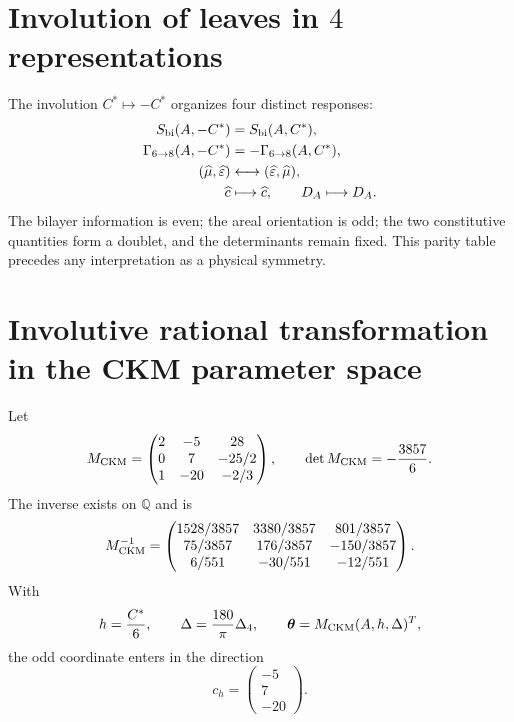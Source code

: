 \section{Involution of leaves in \(4\) representations}

The involution \(C^*\mapsto-C^*\) organizes four distinct responses:
\begin{equation}
\label{rm:eq:modular-sheet-parities}
\begin{aligned}
S_{\rm bi}(A,-C^*)&=S_{\rm bi}(A,C^*),\\
\Gamma_{6\to8}(A,-C^*)&=-\Gamma_{6\to8}(A,C^*),\\
(\widehat\mu,\widehat\varepsilon)&\longleftrightarrow
(\widehat\varepsilon,\widehat\mu),\\
\widehat c&\longmapsto\widehat c,
\qquad D_A\longmapsto D_A.
\end{aligned}
\end{equation}
The bilayer information is even; the areal orientation is odd; the two
constitutive quantities form a doublet, and the determinants remain fixed. This parity
table precedes any interpretation as a physical symmetry.

\section{Involutive rational transformation in the CKM parameter space}

Let
\begin{equation}
\label{rm:eq:modular-Mckm}
M_{\rm CKM}=
\begin{pmatrix}
2&-5&28\\
0&7&-25/2\\
1&-20&-2/3
\end{pmatrix},
\qquad
\det M_{\rm CKM}=-\frac{3857}{6}.
\end{equation}
The inverse exists on \(\mathbb Q\) and is
\begin{equation}
\label{rm:eq:modular-Mckm-inverse}
M_{\rm CKM}^{-1}=
\begin{pmatrix}
1528/3857&3380/3857&801/3857\\
75/3857&176/3857&-150/3857\\
6/551&-30/551&-12/551
\end{pmatrix}.
\end{equation}
With
\begin{equation}
\label{rm:eq:modular-ckm-coordinates}
h=\frac{C^*}{6},
\qquad
\Delta=\frac{180}{\pi}\Delta_4,
\qquad
\boldsymbol\theta=M_{\rm CKM}(A,h,\Delta)^T,
\end{equation}
the odd coordinate enters in the direction
\begin{equation}
\label{rm:eq:modular-ch}
c_h=\begin{pmatrix}-5\\7\\-20\end{pmatrix}.
\end{equation}


